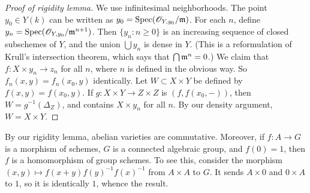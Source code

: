 \begin{proof}[Proof of rigidity lemma]
We use infinitesimal neighborhoods. The point $y_0\in Y(k)$ can be written 
as $y_0=\operatorname{Spec}(\mathscr{O}_{Y,y_0}/\mathfrak{m})$. For each $n$, define 
$y_n = \operatorname{Spec}(\mathscr{O}_{Y,y_0}/\mathfrak{m}^{n+1})$. Then $\{y_n:n\geqslant 0\}$ is 
an increasing sequence of closed subschemes of $Y$, and the union 
$\bigcup y_n$ is dense in $Y$. (This is a reformulation of Krull's 
intersection theorem, which says that $\bigcap \mathfrak{m}^n=0$.) We claim that 
$f:X\times y_n \to z_n$ for all $n$, where $n$ is defined in the obvious 
way.  So $f_n(x,y) = f_n(x_0,y)$ identically. Let 
$W\subset X\times Y$ be defined by $f(x,y) = f(x_0,y)$. If 
$g:X\times Y\to Z\times Z$ is $(f,f(x_0,-))$, then 
$W=g^{-1}(\Delta_Z)$, and contains $X\times y_n$ for all 
$n$. By our density argument, $W=X\times Y$. 
\end{proof}

By our rigidity lemma, abelian varieties are commutative. Moreover, if 
$f:A\to G$ is a morphism of schemes, $G$ is a connected algebraic group, 
and $f(0)=1$, then $f$ is a homomorphism of group schemes. To see this, 
consider the morphism $(x,y)\mapsto f(x+y) f(y)^{-1} f(x)^{-1}$ from 
$A\times A$ to $G$. It sends $A\times 0$ and $0\times A$ to $1$, so it is 
identically $1$, whence the result. 





%
%

%

